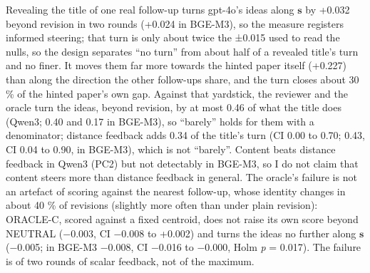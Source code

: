 \documentclass[
  10pt,
]{article}
\begin{document}
Revealing the title of one real
follow-up turns gpt-4o's ideas along
\(\mathbf{s}\) by +0.032 beyond revision
in two rounds (+0.024 in BGE-M3), so the
measure registers informed steering;
that turn is only about twice the ±0.015
used to read the nulls, so the design
separates ``no turn'' from about half of
a revealed title's turn and no finer. It
moves them far more towards the hinted
paper itself (+0.227) than along the
direction the other follow-ups share,
and the turn closes about 30 \% of the
hinted paper's own gap. Against that
yardstick, the reviewer and the oracle
turn the ideas, beyond revision, by at
most 0.46 of what the title does (Qwen3;
0.40 and 0.17 in BGE-M3), so ``barely''
holds for them with a denominator;
distance feedback adds 0.34 of the
title's turn (CI 0.00 to 0.70; 0.43, CI
0.04 to 0.90, in BGE-M3), which is not
``barely''. Content beats distance
feedback in Qwen3 (PC2) but not
detectably in BGE-M3, so I do not claim
that content steers more than distance
feedback in general. The oracle's
failure is not an artefact of scoring
against the nearest follow-up, whose
identity changes in about 40 \% of
revisions (slightly more often than
under plain revision): ORACLE-C, scored
against a fixed centroid, does not raise
its own score beyond NEUTRAL (−0.003, CI
−0.008 to +0.002) and turns the ideas no
further along \(\mathbf{s}\) (−0.005; in
BGE-M3 −0.008, CI −0.016 to −0.000, Holm
\emph{p} = 0.017). The failure is of two
rounds of scalar feedback, not of the
maximum.
\end{document}

